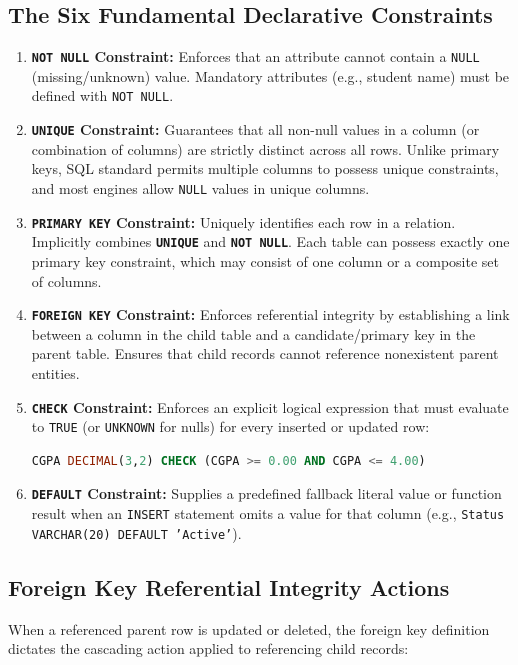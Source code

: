 \subsection{The Six Fundamental Declarative Constraints}

\begin{enumerate}
\item \textbf{\texttt{NOT NULL} Constraint:} Enforces that an attribute cannot contain a \texttt{NULL} (missing/unknown) value. Mandatory attributes (e.g., student name) must be defined with \texttt{NOT NULL}.
\item \textbf{\texttt{UNIQUE} Constraint:} Guarantees that all non-null values in a column (or combination of columns) are strictly distinct across all rows. Unlike primary keys, SQL standard permits multiple columns to possess unique constraints, and most engines allow \texttt{NULL} values in unique columns.
\item \textbf{\texttt{PRIMARY KEY} Constraint:} Uniquely identifies each row in a relation. Implicitly combines \textbf{\texttt{UNIQUE}} and \textbf{\texttt{NOT NULL}}. Each table can possess exactly one primary key constraint, which may consist of one column or a composite set of columns.
\item \textbf{\texttt{FOREIGN KEY} Constraint:} Enforces referential integrity by establishing a link between a column in the child table and a candidate/primary key in the parent table. Ensures that child records cannot reference nonexistent parent entities.
\item \textbf{\texttt{CHECK} Constraint:} Enforces an explicit logical expression that must evaluate to \texttt{TRUE} (or \texttt{UNKNOWN} for nulls) for every inserted or updated row:
\begin{lstlisting}[language=SQL]
CGPA DECIMAL(3,2) CHECK (CGPA >= 0.00 AND CGPA <= 4.00)
\end{lstlisting}
\item \textbf{\texttt{DEFAULT} Constraint:} Supplies a predefined fallback literal value or function result when an \texttt{INSERT} statement omits a value for that column (e.g., \texttt{Status VARCHAR(20) DEFAULT 'Active'}).
\end{enumerate}

\subsection{Foreign Key Referential Integrity Actions}

When a referenced parent row is updated or deleted, the foreign key definition dictates the cascading action applied to referencing child records:

